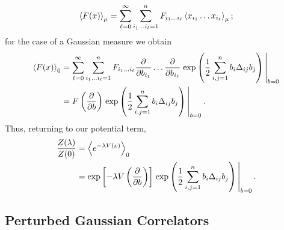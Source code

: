 \documentclass{article}
\numberwithin{equation}{section}
\begin{document}
\begin{equation}
    \ev{F(x)}_\mu = \sum_{\ell = 0}^\infty \sum_{i_1 \dots i_\ell = 1}^n F_{i_1 \dots i_\ell} \ev{x_{i_1} \dots x_{i_\ell}}_\mu;
\end{equation}
for the case of a Gaussian measure we obtain
\begin{equation}
\begin{aligned}
    \ev{F(x)}_0 &= \sum_{\ell = 0}^\infty \sum_{i_1 \dots i_\ell = 1}^n F_{i_1 \dots i_\ell} \pdv{b_{i_1}} \dots \pdv{b_{i_\ell}} \eval{\exp\left(\frac{1}{2}\sum_{i,j=1}^n b_i \Delta_{ij} b_j\right)}_{b=0} \\
    &= F \left(\pdv{b}\right) \eval{\exp\left(\frac{1}{2}\sum_{i,j=1}^n b_i \Delta_{ij} b_j\right)}_{b=0}.
\end{aligned}
\end{equation}
Thus, returning to our potential term,
\begin{equation} \label{eq:z0/zlambda}
\begin{aligned}
    \frac{Z(\lambda)}{Z(0)} &= \ev{e^{-\lambda V(x)}}_0 \\
    &= \exp\left[-\lambda V\left(\pdv{b}\right)\right] \eval{\exp\left(\frac{1}{2}\sum_{i,j=1}^n b_i \Delta_{ij} b_j\right)}_{b=0}.
\end{aligned}
\end{equation}


\subsection{Perturbed Gaussian Correlators}
\end{document}
